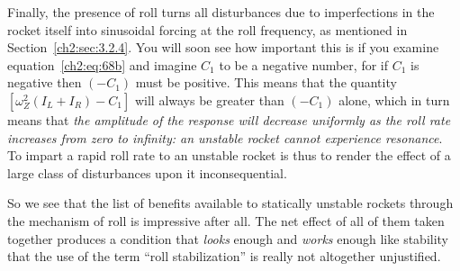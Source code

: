 Finally, the presence of roll turns all disturbances due to imperfections in
the rocket itself into sinusoidal forcing at the roll frequency, as mentioned
in Section~\ref{ch2:sec:3.2.4}. You will soon see how important this is if
you examine equation~\eqref{ch2:eq:68b} and imagine $C_1$ to be a negative
number, for if $C_1$ is negative then $(-C_1)$ must be positive. This means
that the quantity $\left[\omega_Z^{2}(I_L + I_R) - C_1\right]$ will always be
greater than $(-C_1)$ alone, which in turn means that \emph{the amplitude of
the response will decrease uniformly as the roll rate increases from zero to
infinity: an unstable rocket cannot experience resonance}. To impart a rapid
roll rate to an unstable rocket is thus to render the effect of a large class
of disturbances upon it inconsequential.

So we see that the list of benefits available to statically unstable rockets
through the mechanism of roll is impressive after all. The net effect of all
of them taken together produces a condition that \emph{looks} enough and
\emph{works} enough like stability that the use of the term ``roll
stabilization'' is really not altogether unjustified.
